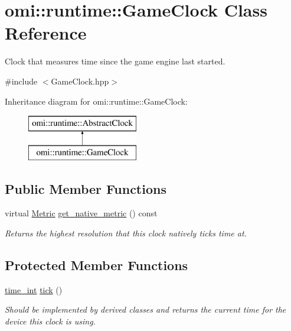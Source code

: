 \hypertarget{classomi_1_1runtime_1_1_game_clock}{}\section{omi\+:\+:runtime\+:\+:Game\+Clock Class Reference}
\label{classomi_1_1runtime_1_1_game_clock}


Clock that measures time since the game engine last started.  




{\ttfamily \#include $<$Game\+Clock.\+hpp$>$}

Inheritance diagram for omi\+:\+:runtime\+:\+:Game\+Clock\+:\begin{figure}[H]
\begin{center}
\leavevmode
\includegraphics[height=2.000000cm]{classomi_1_1runtime_1_1_game_clock}
\end{center}
\end{figure}
\subsection*{Public Member Functions}
\begin{DoxyCompactItemize}
\item 
virtual \hyperlink{classomi_1_1runtime_1_1_abstract_clock_a6af6e30a02165469ffcdcbd512d47a1b}{Metric} \hyperlink{classomi_1_1runtime_1_1_game_clock_a656c46b8609b36aa109be61413a978c8}{get\+\_\+native\+\_\+metric} () const \hypertarget{classomi_1_1runtime_1_1_game_clock_a656c46b8609b36aa109be61413a978c8}{}\label{classomi_1_1runtime_1_1_game_clock_a656c46b8609b36aa109be61413a978c8}

\begin{DoxyCompactList}\small\item\em Returns the highest resolution that this clock natively ticks time at. \end{DoxyCompactList}\end{DoxyCompactItemize}
\subsection*{Protected Member Functions}
\begin{DoxyCompactItemize}
\item 
\hyperlink{classomi_1_1runtime_1_1_abstract_clock_af2122541388aea885afc08e8135340f7}{time\+\_\+int} \hyperlink{classomi_1_1runtime_1_1_game_clock_a8c0942d48db3f207b0de2a7ff77bd52e}{tick} ()
\begin{DoxyCompactList}\small\item\em Should be implemented by derived classes and returns the current time for the device this clock is using. \end{DoxyCompactList}\end{DoxyCompactItemize}

